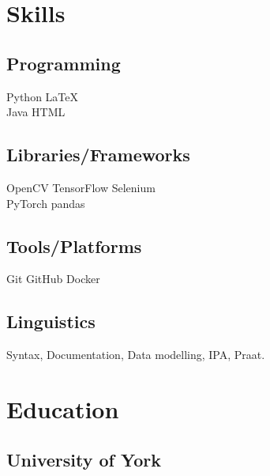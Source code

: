 \documentclass[]{plushcv}
\begin{document}
\begin{minipage}[t]{0.25\textwidth} 


\section{Skills}
\subsection{Programming}
\sectionsep
{} 
Python \textbullet{} LaTeX  \\
\sectionsep
{}
Java \textbullet{}  HTML \\
\sectionsep
\subsection{Libraries/Frameworks}
\sectionsep
OpenCV \textbullet{} TensorFlow \textbullet{} Selenium\\
PyTorch \textbullet{} pandas \\
\sectionsep
\subsection{Tools/Platforms}
\sectionsep
Git \textbullet{} GitHub \textbullet{} Docker \\
\sectionsep
\subsection{Linguistics}
\sectionsep
Syntax, Documentation, Data modelling, IPA, Praat.
\sectionsep


\section{Education} 

\subsection{University of York}

\sectionsep


\end{minipage}
\end{document}
